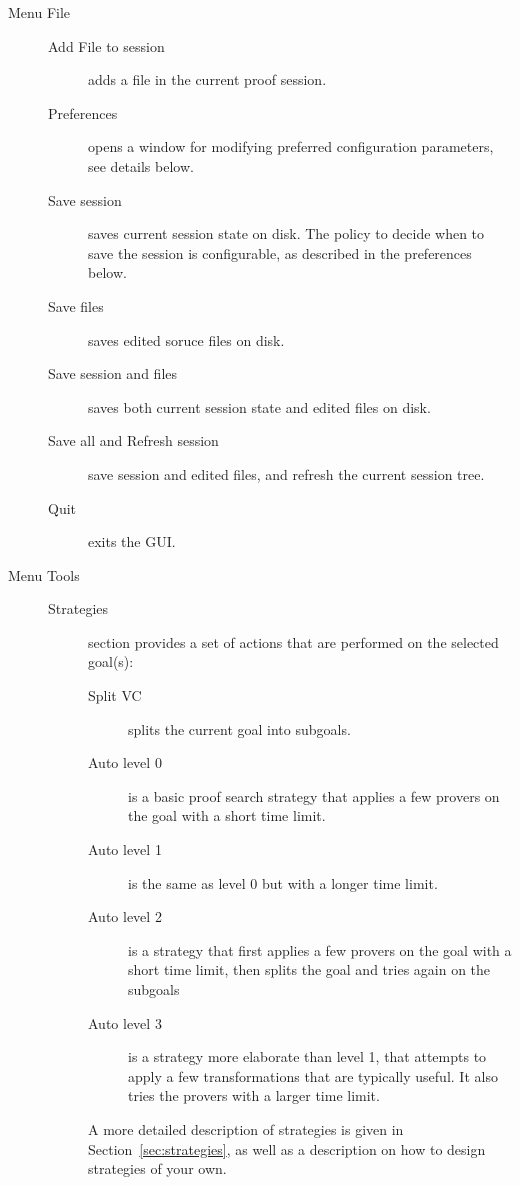 \begin{description}
\item[Menu \textsf{File}]\emptyitem
\begin{description}
\item[Add File to session] adds a file in the current proof session.
\item[Preferences] opens a window for modifying preferred
  configuration parameters, see details below.
\item[Save session] saves current session state on disk. The policy to decide when to save the session is configurable, as described in the preferences below.
\item[Save files] saves edited soruce files on disk.
\item[Save session and files] saves both current session state and edited files on disk.
\item[Save all and Refresh session] save session and edited files, and refresh the current session tree.
\item[Quit] exits the GUI.
\end{description}

\item[Menu \textsf{Tools}]\emptyitem
\begin{description}
\item[Strategies] section provides a set of actions that are
  performed on the selected goal(s):
  \begin{description}
  \item[Split VC] splits the current goal into subgoals.
  \item[Auto level 0] is a basic proof search strategy that applies a few provers
    on the goal with a short time limit.
  \item[Auto level 1] is the same as level 0 but with a longer time limit.
  \item[Auto level 2] is a strategy that first applies a few provers
    on the goal with a short time limit, then splits the goal and
    tries again on the subgoals
  \item[Auto level 3] is a strategy more elaborate than level 1, that
    attempts to apply a few transformations that are typically
    useful. It also tries the provers with a larger time limit.
  \end{description}
  A more detailed description of strategies is given in
  Section~\ref{sec:strategies}, as well as a description on how to
  design strategies of your own.


\end{description}
\end{description}
